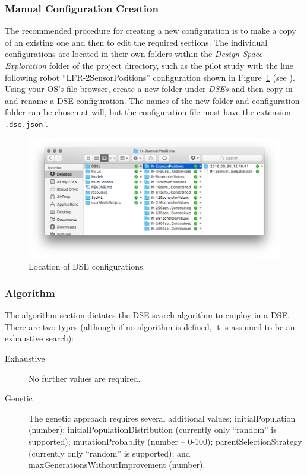 \subsubsection{Manual Configuration Creation}\label{sec:dse:edit:manual}
The recommended procedure for creating a new configuration is to make a copy of an existing one and then to edit the required sections.  The individual configurations are located in their own folders within the \textit{Design Space Exploration} folder of the \intoapp{} project directory, such as the pilot study with the line following robot ``LFR-2SensorPositions'' configuration shown in Figure~\ref{fig:dse:edit:location} (see \cite{INTOCPSD3.5}).  Using your OS's file browser, create a new folder under \textit{DSEs} and then copy in and rename a DSE configuration.  The names of the new folder and configuration folder can be chosen at will, but the configuration file must have the extension \texttt{.dse.json} .  
%
%
%
\begin{figure}[ht]
	\centering
	\includegraphics[width=\textwidth]{figures/dse/config-location}
	\caption{Location of DSE configurations.}\label{fig:dse:edit:location}
\end{figure}
%
%
%
\subsubsection{Algorithm}\label{sec:dse:edit:algorithm}

The algorithm section dictates the DSE search algorithm to employ in a DSE. There are two types (although if no algorithm is defined, it is assumed to be an exhaustive search):
%
%
\begin{description}
	\item [Exhaustive] No further values are required.
	\item[Genetic] The genetic approach requires several additional values; initialPopulation (number); initialPopulationDistribution (currently only ``random'' is supported); mutationProbablity (number -- 0-100); parentSelectionStrategy (currently only ``random'' is supported); and maxGenerationsWithoutImprovement (number).
\end{description}
%


